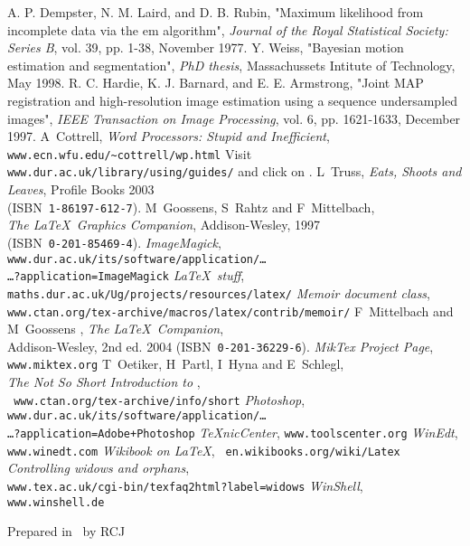 \begin{thebibliography}{9999}%
%
A. P. Dempster, N. M. Laird, and D. B. Rubin, "Maximum likelihood from incomplete data via the em algorithm", \textsl{Journal of the Royal Statistical Society: Series B}, vol. 39, pp. 1-38, November 1977.
%
Y. Weiss, "Bayesian motion estimation and segmentation", \textsl{PhD thesis}, Massachussets Intitute of Technology, May 1998.
%
R. C. Hardie, K. J. Barnard, and E. E. Armstrong, "Joint MAP registration and high-resolution image estimation using a sequence undersampled images", \textsl{IEEE Transaction on Image Processing}, vol. 6, pp. 1621-1633, December 1997.
%
A~Cottrell, \textsl{Word Processors: Stupid and
Inefficient},
\\ \mbox{}\hfill\texttt{www.ecn.wfu.edu/\~{}cottrell/wp.html}
Visit \texttt{www.dur.ac.uk/library/using/guides/}
and click on .
L~Truss, \textsl{Eats, Shoots and Leaves}, Profile
  Books 2003\\ \mbox{}\hfill(ISBN~\texttt{1-86197-612-7}).
M~Goossens, S~Rahtz and F~Mittelbach,\\
  \mbox{}\hfill \textsl{The \LaTeX\ Graphics Companion},
  Addison-Wesley, 1997\\  \mbox{}\hfill(ISBN~\texttt{0-201-85469-4}).
 \textsl{ImageMagick}, {\tt%
www.dur.ac.uk/its/software/application/\dots
\\ \mbox{}\hfill\dots?application=ImageMagick}
 \textsl{\LaTeX\ stuff},
	\texttt{maths.dur.ac.uk/Ug/projects/resources/latex/}
 \textsl{Memoir document class},\\ \mbox{}\hfill
   \texttt{www.ctan.org/tex-archive/macros/latex/contrib/memoir/}
F~Mittelbach and M~Goossens \etal, \textsl{The
\LaTeX\ Companion},\\  \mbox{}\hfill Addison-Wesley, 2nd ed. 2004
(ISBN~\texttt{0-201-36229-6}).
 \textsl{MikTex Project Page}, \texttt{www.miktex.org}
T~Oetiker, H~Partl, I~Hyna and E~Schlegl,\\
\mbox{}\hfill
\textsl{The Not So Short Introduction to \LaTeXe},\\ \mbox{}\hfill{\tt
www.ctan.org/tex-archive/info/short}
 \textsl{Photoshop}, {\tt%
www.dur.ac.uk/its/software/application/\dots
\\ \mbox{}\hfill\dots?application=Adobe+Photoshop}
 \textsl{TeXnicCenter}, \texttt{www.toolscenter.org}
 \textsl{WinEdt}, \texttt{www.winedt.com}
 \textsl{Wikibook on \LaTeX}, \texttt{%
	en.wikibooks.org/wiki/Latex}
 \textsl{Controlling widows and orphans}, 
\\ \mbox{}\hfill\texttt{www.tex.ac.uk/cgi-bin/texfaq2html?label=widows}
 \textsl{WinShell}, \texttt{www.winshell.de}
\end{thebibliography}
\vfill
\begin{flushright}\small Prepared in \LaTeXe\ by RCJ\end{flushright}
